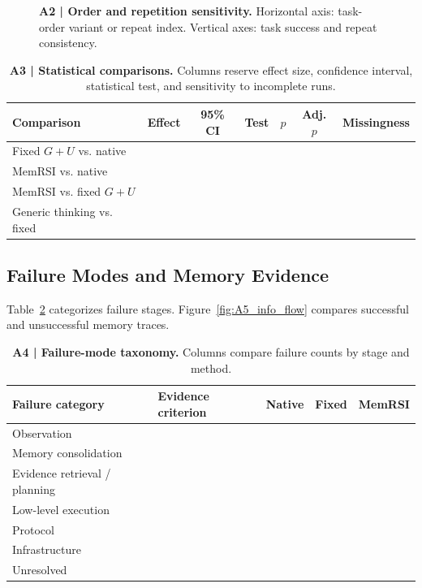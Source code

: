 \begin{figure}[t]
\centering
{}
\caption{\textbf{A2 | Order and repetition sensitivity.}
Horizontal axis: task-order variant or repeat index.
Vertical axes: task success and repeat consistency.}
\label{fig:A2_order_sensitivity}
\end{figure}

\begin{table}[t]
\centering
\caption{\textbf{A3 | Statistical comparisons.}
Columns reserve effect size, confidence interval,
statistical test, and sensitivity to incomplete runs.}
\label{tab:A3_statistics}
\small
\setlength{\tabcolsep}{6pt}
\renewcommand{\arraystretch}{1.16}
\begin{tabular}{@{}lcccccc@{}}
\toprule
\rowcolor{cvprblue!8}
\textbf{Comparison}
& \textbf{Effect}
& \textbf{95\% CI}
& \textbf{Test}
& \textbf{$p$}
& \textbf{Adj. $p$}
& \textbf{Missingness} \\
\midrule
Fixed $G+U$ vs. native & & & & & & \\
MemRSI vs. native & & & & & & \\
MemRSI vs. fixed $G+U$ & & & & & & \\
Generic thinking vs. fixed & & & & & & \\
\bottomrule
\end{tabular}
\end{table}

\subsection{Failure Modes and Memory Evidence}

Table~\ref{tab:A4_failure_taxonomy} categorizes
failure stages. Figure~\ref{fig:A5_info_flow}
compares successful and unsuccessful memory traces.

\begin{table}[t]
\centering
\caption{\textbf{A4 | Failure-mode taxonomy.}
Columns compare failure counts by stage and method.}
\label{tab:A4_failure_taxonomy}
\small
\setlength{\tabcolsep}{7pt}
\renewcommand{\arraystretch}{1.16}
\begin{tabular}{@{}lp{6.0cm}ccc@{}}
\toprule
\rowcolor{cvprblue!8}
\textbf{Failure category}
& \textbf{Evidence criterion}
& \textbf{Native}
& \textbf{Fixed}
& \textbf{MemRSI} \\
\midrule
Observation & & & & \\
Memory consolidation & & & & \\
Evidence retrieval / planning & & & & \\
Low-level execution & & & & \\
Protocol & & & & \\
Infrastructure & & & & \\
Unresolved & & & & \\
\bottomrule
\end{tabular}
\end{table}

